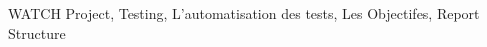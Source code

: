 \begin{introductiongenerale}
WATCH Project, Testing, L'automatisation des tests, Les Objectifes, Report Structure
\end{introductiongenerale}